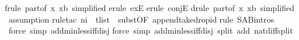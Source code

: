 \begin{isabellebody}
frule\ part{}{\isacharbrackleft}of\ {\isachardoublequote}{\isacharpercent}x{\isachardot}\ x{\isacharequal}b{\isachardoublequote}{\isacharcomma}\ simplified{\isacharbrackright}{\isacharparenright}\isanewline
{}erule\ exE{\isacharparenright}\isanewline
{}erule\ conjE{\isacharparenright}\isanewline
{}drule\ part{}{\isacharbrackleft}of\ {\isachardoublequote}{\isacharpercent}x{\isachardot}\ x{\isacharequal}b{\isachardoublequote}{\isacharcomma}\ simplified{\isacharbrackright}{\isacharparenright}\isanewline
\ assumption{\isacharparenright}\isanewline
{}rule{\isacharunderscore}tac\ n{}{\isacharequal}i\ \ t{\isacharequal}list\ \ subst{\isacharbrackleft}OF\ append{\isacharunderscore}take{\isacharunderscore}drop{\isacharunderscore}id{\isacharbrackright}{\isacharparenright}\isanewline
{}rule\ S{\isacharunderscore}A{\isacharunderscore}B{\isachardot}intros{\isacharparenright}\isanewline
\ force\ simp\ add{\isacharcolon}min{\isacharunderscore}less{\isacharunderscore}iff{\isacharunderscore}disj{\isacharparenright}\isanewline
{}force\ simp\ add{\isacharcolon}min{\isacharunderscore}less{\isacharunderscore}iff{\isacharunderscore}disj\ split\ add{\isacharcolon}\ nat{\isacharunderscore}diff{\isacharunderscore}split{\isacharparenright}\isanewline
\end{isabellebody}%
